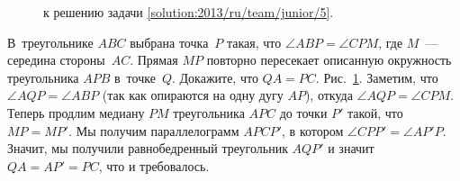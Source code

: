 \ifsolution
\begin{figure}\centering
    \caption{к решению задачи \ref{solution:2013/ru/team/junior/5}.}
    \label{fig:solution:2013/ru/team/junior/5}
\end{figure}%
\fi %

\problem{}
В~треугольнике $ABC$ выбрана точка~$P$ такая, что $\angle ABP = \angle CPM$,
где $M$~--- середина стороны~$AC$.
Прямая $MP$ повторно пересекает описанную окружность треугольника $APB$
в~точке~$Q$.
Докажите, что $QA = PC$.
\solution
\label{solution:2013/ru/team/junior/5}
Рис.~\ref{fig:solution:2013/ru/team/junior/5}.
Заметим, что $\angle AQP = \angle ABP$ (так как опираются на одну дугу $AP$),
откуда $\angle AQP = \angle CPM$.
Теперь продлим медиану $PM$ треугольника $APC$ до точки $P'$ такой, что
$MP = MP'$.
Мы получим параллелограмм $APCP'$, в котором $\angle CPP' = \angle AP'P$.
Значит, мы получили равнобедренный треугольник $AQP'$ и значит $QA = AP' = PC$,
что и требовалось. 
\endproblem
